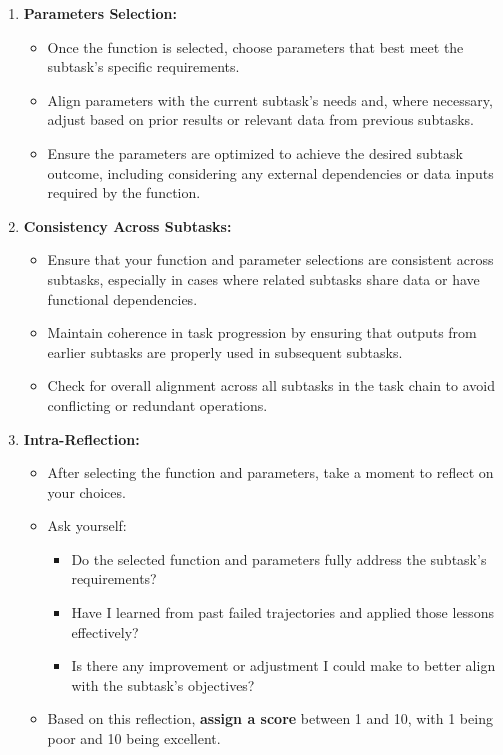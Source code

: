 \documentclass{article}
\begin{document}
\begin{tcolorbox}[
    breakable,
    colback=yellow!5!white,
    colframe=yellow!75!black,
    title=Tool Agent System Prompt,
    fonttitle=\bfseries
]
\begin{enumerate}
    \item \textbf{Parameters Selection:}
    \begin{itemize}
        \item Once the function is selected, choose parameters that best meet the subtask's specific requirements.
        \item Align parameters with the current subtask's needs and, where necessary, adjust based on prior results or relevant data from previous subtasks.
        \item Ensure the parameters are optimized to achieve the desired subtask outcome, including considering any external dependencies or data inputs required by the function.
    \end{itemize}

    \item \textbf{Consistency Across Subtasks:}
    \begin{itemize}
        \item Ensure that your function and parameter selections are consistent across subtasks, especially in cases where related subtasks share data or have functional dependencies.
        \item Maintain coherence in task progression by ensuring that outputs from earlier subtasks are properly used in subsequent subtasks.
        \item Check for overall alignment across all subtasks in the task chain to avoid conflicting or redundant operations.
    \end{itemize}

    \item \textbf{Intra-Reflection:}
    \begin{itemize}
        \item After selecting the function and parameters, take a moment to reflect on your choices.
        \item Ask yourself:
        \begin{itemize}
            \item Do the selected function and parameters fully address the subtask's requirements?
            \item Have I learned from past failed trajectories and applied those lessons effectively?
            \item Is there any improvement or adjustment I could make to better align with the subtask's objectives?
        \end{itemize}
        \item Based on this reflection, \textbf{assign a score} between 1 and 10, with 1 being poor and 10 being excellent.
    \end{itemize}
\end{enumerate}


\end{tcolorbox}
\end{document}
